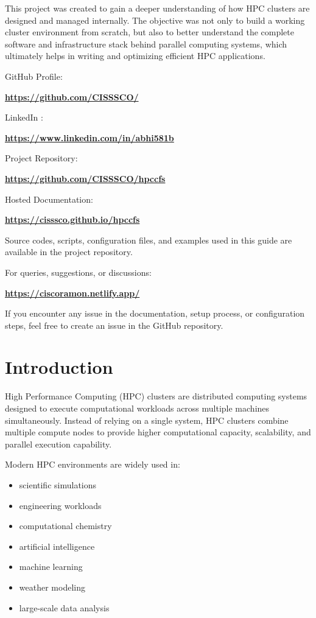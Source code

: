 \documentclass[11pt]{article}
\begin{document}
This project was created to gain a deeper understanding of how HPC
clusters are designed and managed internally. The objective was not only
to build a working cluster environment from scratch, but also to better
understand the complete software and infrastructure stack behind
parallel computing systems, which ultimately helps in writing and
optimizing efficient HPC applications.

GitHub Profile:

\textbf{\href{https://github.com/CISSSCO/}{https://github.com/CISSSCO/}}

LinkedIn :

\textbf{\href{https://www.linkedin.com/in/abhi581b}{https://www.linkedin.com/in/abhi581b}}

Project Repository:

\textbf{\href{https://github.com/CISSSCO/hpccfs}{https://github.com/CISSSCO/hpccfs}}

Hosted Documentation:

\textbf{\href{https://cisssco.github.io/hpccfs}{https://cisssco.github.io/hpccfs}}

Source codes, scripts, configuration files, and examples used in this
guide are available in the project repository.

For queries, suggestions, or discussions:

\textbf{\href{https://ciscoramon.netlify.app/}{https://ciscoramon.netlify.app/}}

If you encounter any issue in the documentation, setup process, or
configuration steps, feel free to create an issue in the GitHub
repository.
\section{Introduction}
\label{sec:org56c0353}

High Performance Computing (HPC) clusters are distributed computing
systems designed to execute computational workloads across multiple
machines simultaneously. Instead of relying on a single system, HPC
clusters combine multiple compute nodes to provide higher computational
capacity, scalability, and parallel execution capability.

Modern HPC environments are widely used in:

\begin{itemize}
\item scientific simulations
\item engineering workloads
\item computational chemistry
\item artificial intelligence
\item machine learning
\item weather modeling
\item large-scale data analysis
\end{itemize}
\end{document}
